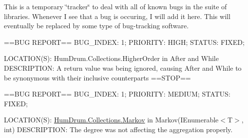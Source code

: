 This is a temporary \char`\"{}tracker\char`\"{} to deal with all of known bugs in the suite of libraries. Whenever I see that a bug is occuring, I will add it here. This will eventually be replaced by some type of bug-\/tracking software.

==B\+UG R\+E\+P\+O\+RT== B\+U\+G\+\_\+\+I\+N\+D\+EX\+: 1; P\+R\+I\+O\+R\+I\+TY\+: H\+I\+GH; S\+T\+A\+T\+US\+: F\+I\+X\+ED;
\begin{DoxyItemize}
\item L\+O\+C\+A\+T\+I\+O\+N(\+S)\+: Hum\+Drum.\+Collections.\+Higher\+Order in After and While D\+E\+S\+C\+R\+I\+P\+T\+I\+ON\+: A return value was being ignored, causing After and While to be synonymous with their inclusive counterparts ==S\+T\+OP==
\end{DoxyItemize}

==B\+UG R\+E\+P\+O\+RT== B\+U\+G\+\_\+\+I\+N\+D\+EX\+: 1; P\+R\+I\+O\+R\+I\+TY\+: M\+E\+D\+I\+UM; S\+T\+A\+T\+US\+: F\+I\+X\+ED;
\begin{DoxyItemize}
\item L\+O\+C\+A\+T\+I\+O\+N(\+S)\+: \hyperlink{namespaceHumDrum_1_1Collections_1_1Markov}{Hum\+Drum.\+Collections.\+Markov} in Markov(\+I\+Enumerable$<$\+T$>$, int) D\+E\+S\+C\+R\+I\+P\+T\+I\+ON\+: The degree was not affecting the aggregation properly. 
\end{DoxyItemize}